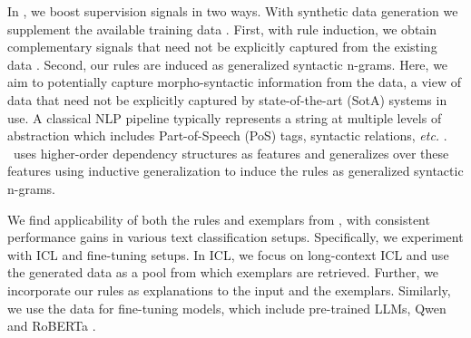  

In \our, we boost supervision signals in two ways. With synthetic data generation we supplement the available training data \cite{DBLP:journals/corr/abs-1711-10160ratner,pryzant-etal-2022-automatic}. First, with rule induction, we obtain complementary signals that need not be explicitly captured from the existing data \cite{maheshwari2021semi, singhal-etal-2023-intendd}. Second, our rules are induced as generalized syntactic n-grams. Here, we aim to potentially capture morpho-syntactic information from the data, a view of data that need not be explicitly captured by state-of-the-art (SotA) systems in use. A classical NLP pipeline typically represents a string at multiple levels of abstraction which includes Part-of-Speech (PoS) tags, syntactic relations, \emph{etc.} \cite{manning-etal-2014-stanford}. \our~uses higher-order dependency structures as features and generalizes over these features using inductive generalization \cite{popplestone1970experiment} to induce the rules as generalized syntactic n-grams. 
 
 

 

We find applicability of both the rules and exemplars from \our, with consistent performance gains in various text classification setups. Specifically, we experiment with ICL and fine-tuning setups. In ICL, we focus on long-context ICL \cite{li2024long,bertsch2024context} and use the generated data as a pool from which exemplars are retrieved. Further, we incorporate our rules as explanations to the input and the exemplars. Similarly, we use the data for fine-tuning models, which include pre-trained LLMs, Qwen \cite{Qwen2,Qwen2.5} and RoBERTa \cite{liu2019roberta}. %

